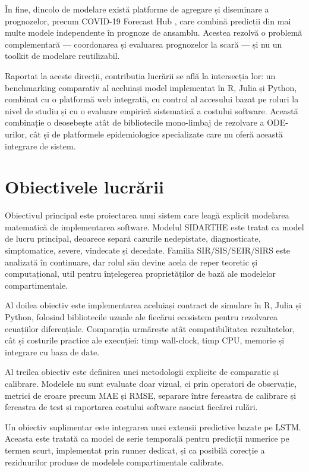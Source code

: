 În fine, dincolo de modelare există platforme de agregare și diseminare a
prognozelor, precum COVID-19 Forecast Hub \cite{cramer2022forecasthub}, care
combină predicții din mai multe modele independente în prognoze de ansamblu.
Acestea rezolvă o problemă complementară --- coordonarea și evaluarea
prognozelor la scară --- și nu un toolkit de modelare reutilizabil.

Raportat la aceste direcții, contribuția lucrării se află la intersecția lor:
un benchmarking comparativ al aceluiași model implementat în R, Julia și Python,
combinat cu o platformă web integrată, cu control al accesului bazat pe roluri la
nivel de studiu și cu o evaluare empirică sistematică a costului software. Această
combinație o deosebește atât de bibliotecile mono-limbaj de rezolvare a ODE-urilor,
cât și de platformele epidemiologice specializate care nu oferă această integrare
de sistem.

{}
\section*{Obiectivele lucrării}
\label{sec:obiective}

Obiectivul principal este proiectarea unui sistem care leagă explicit modelarea
matematică de implementarea software. Modelul SIDARTHE este tratat ca model de
lucru principal, deoarece separă cazurile nedepistate, diagnosticate,
simptomatice, severe, vindecate și decedate. Familia
SIR/SIS/SEIR/SIRS este analizată în continuare, dar rolul său devine acela de
reper teoretic și computațional, util pentru înțelegerea proprietăților de bază
ale modelelor compartimentale.

Al doilea obiectiv este implementarea aceluiași contract de simulare în R, Julia
și Python, folosind bibliotecile uzuale ale fiecărui ecosistem pentru rezolvarea
ecuațiilor diferențiale. Comparația urmărește atât compatibilitatea rezultatelor,
cât și costurile practice ale execuției: timp wall-clock, timp CPU, memorie și
integrare cu baza de date.

Al treilea obiectiv este definirea unei metodologii explicite de comparație și
calibrare. Modelele nu sunt evaluate doar vizual, ci prin operatori de observație,
metrici de eroare precum MAE și RMSE, separare între fereastra de calibrare și
fereastra de test și raportarea costului software asociat fiecărei rulări.

Un obiectiv suplimentar este integrarea unei extensii predictive bazate pe LSTM.
Aceasta este tratată ca model de serie temporală pentru predicții numerice pe
termen scurt, implementat prin runner dedicat, și ca posibilă corecție a
reziduurilor produse de modelele compartimentale calibrate.

